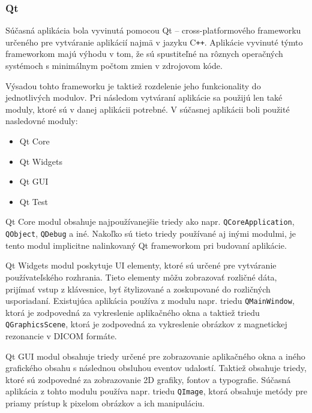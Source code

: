 
\subsubsection {Qt}

\quad Súčasná aplikácia bola vyvinutá pomocou Qt -- cross-platformového frameworku určeného pre vytváranie aplikácií najmä v jazyku C\texttt{++}. Aplikácie vyvinuté týmto frameworkom majú výhodu v tom, že sú spustiteľné na rôznych operačných systémoch s minimálnym počtom zmien v zdrojovom kóde.

Výsadou tohto frameworku je taktiež rozdelenie jeho funkcionality do jednotlivých modulov. Pri následom vytváraní aplikácie sa použijú len také moduly, ktoré sú v danej aplikácii potrebné. \linebreak V súčasnej aplikácii boli použité nasledovné moduly: 

\begin{itemize}
\item {Qt Core}
\item {Qt Widgets}
\item {Qt GUI}
\item {Qt Test}
\end{itemize}

Qt Core modul obsahuje najpoužívanejšie triedy ako napr. \lstinline{QCoreApplication}, \lstinline{QObject}, \lstinline{QDebug} a iné. Nakoľko sú tieto triedy používané aj inými modulmi, je tento modul implicitne nalinkovaný Qt frameworkom pri budovaní aplikácie. \newline

Qt Widgets modul poskytuje UI elementy, ktoré sú určené pre vytváranie používateľského rozhrania. Tieto elementy môžu zobrazovať rozličné dáta, prijímať vstup z klávesnice, byť štylizované a zoskupované do rozličných usporiadaní. Existujúca aplikácia používa z modulu napr. triedu \lstinline{QMainWindow}, ktorá je zodpovedná za vykreslenie aplikačného okna a taktiež triedu \lstinline{QGraphicsScene}, ktorá je zodpovedná za vykreslenie obrázkov z magnetickej rezonancie v DICOM formáte. \newline

Qt GUI modul obsahuje triedy určené pre zobrazovanie aplikačného okna a iného grafického obsahu s následnou obsluhou eventov udalostí. Taktiež obsahuje triedy, ktoré sú zodpovedné za zobrazovanie 2D grafiky, fontov a typografie.
Súčasná aplikácia z tohto modulu používa napr. triedu \lstinline{QImage}, ktorá obsahuje metódy pre priamy prístup k pixelom obrázkov a ich manipuláciu. \newline

